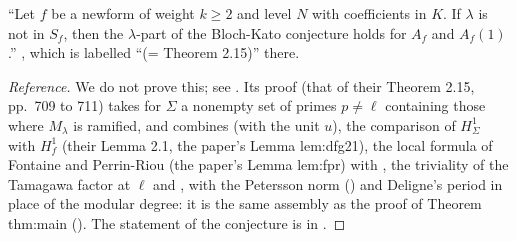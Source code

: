 \begin{theorem}\label{thm:congruence:dfg01}
``Let $f$ be a newform of weight $k\ge2$ and level $N$ with coefficients in $K$. If $\lambda$ is not in $S_f$, then the $\lambda$-part of the Bloch-Kato conjecture holds for $A_f$ and $A_f(1)$.''
\cite[Theorem 0.1]{DFG04}, which is labelled ``(= Theorem 2.15)'' there.
\end{theorem}

\begin{proof}[Reference]
We do not prove this; see \cite[Sections 2.3, 2.4]{DFG04}. Its proof (that of their Theorem 2.15, pp.~709 to 711) takes for $\Sigma$ a nonempty set of primes $p\ne\ell$ containing those
where $M_\lambda$ is ramified, and combines  (with the unit $u$), the comparison of $H^1_\Sigma$ with $H^1_f$ (their Lemma 2.1, the paper's Lemma lem:dfg21), the local formula of
Fontaine and Perrin-Riou (the paper's Lemma lem:fpr) with \cite[(57)]{DFG04}, the triviality of the Tamagawa factor at $\ell$ \cite[Proposition 2.16]{DFG04} and , with the
Petersson norm (\cite[Lemma 2.12]{DFG04}) and Deligne's period \cite[Theorem 2.10]{DFG04} in place of the modular degree:
it is the same assembly as the proof of Theorem thm:main (). The statement of the conjecture is in .
\end{proof}

